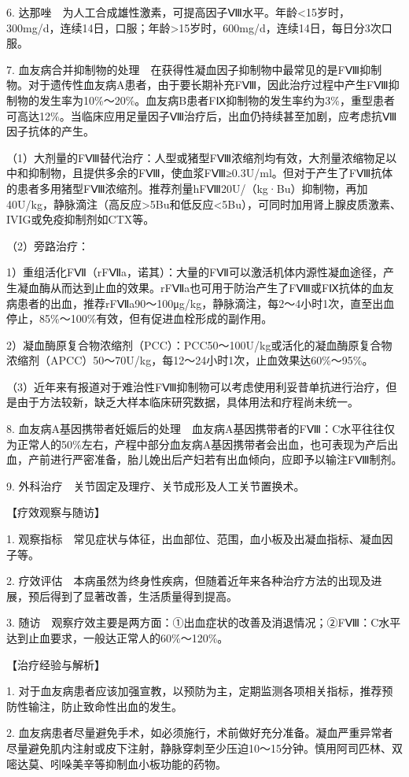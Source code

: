 6.
达那唑　为人工合成雄性激素，可提高因子Ⅷ水平。年龄<15岁时，300mg/d，连续14日，口服；年龄\textgreater{}15岁时，600mg/d，连续14日，每日分3次口服。

7.
血友病合并抑制物的处理　在获得性凝血因子抑制物中最常见的是FⅧ抑制物。对于遗传性血友病A患者，由于要长期补充FⅧ，因此治疗过程中产生FⅧ抑制物的发生率为10\%～20\%。血友病B患者FⅨ抑制物的发生率约为3\%，重型患者可高达12\%。当临床应用足量因子Ⅷ治疗后，出血仍持续甚至加剧，应考虑抗Ⅷ因子抗体的产生。

（1）大剂量的FⅧ替代治疗：人型或猪型FⅧ浓缩剂均有效，大剂量浓缩物足以中和抑制物，且提供多余的FⅧ，使血浆FⅧ≥0.3U/ml。但对于产生了FⅧ抗体的患者多用猪型FⅧ浓缩剂。推荐剂量hFⅧ20U/（kg·Bu）抑制物，再加40U/kg，静脉滴注（高反应\textgreater{}5Bu和低反应<5Bu），可同时加用肾上腺皮质激素、IVIG或免疫抑制剂如CTX等。

（2）旁路治疗：

1）重组活化FⅦ（rFⅦa，诺其）：大量的FⅦ可以激活机体内源性凝血途径，产生凝血酶从而达到止血的效果。rFⅦa也可用于防治产生了FⅧ或FⅨ抗体的血友病患者的出血，推荐rFⅦa90～100μg/kg，静脉滴注，每2～4小时1次，直至出血停止，85\%～100\%有效，但有促进血栓形成的副作用。

2）凝血酶原复合物浓缩剂（PCC）：PCC50～100U/kg或活化的凝血酶原复合物浓缩剂（APCC）50～70U/kg，每12～24小时1次，止血效果达60\%～95\%。

（3）近年来有报道对于难治性FⅧ抑制物可以考虑使用利妥昔单抗进行治疗，但是由于方法较新，缺乏大样本临床研究数据，具体用法和疗程尚未统一。

8.
血友病A基因携带者妊娠后的处理　血友病A基因携带者的FⅧ：C水平往往仅为正常人的50\%左右，产程中部分血友病A基因携带者会出血，也可表现为产后出血，产前进行严密准备，胎儿娩出后产妇若有出血倾向，应即予以输注FⅧ制剂。

9. 外科治疗　关节固定及理疗、关节成形及人工关节置换术。

【疗效观察与随访】

1.
观察指标　常见症状与体征，出血部位、范围，血小板及出凝血指标、凝血因子等。

2.
疗效评估　本病虽然为终身性疾病，但随着近年来各种治疗方法的出现及进展，预后得到了显著改善，生活质量得到提高。

3.
随访　观察疗效主要是两方面：①出血症状的改善及消退情况；②FⅧ：C水平达到止血要求，一般达正常人的60\%～120\%。

【治疗经验与解析】

1.
对于血友病患者应该加强宣教，以预防为主，定期监测各项相关指标，推荐预防性输注，防止致命性出血的发生。

2.
血友病患者尽量避免手术，如必须施行，术前做好充分准备。凝血严重异常者尽量避免肌内注射或皮下注射，静脉穿刺至少压迫10～15分钟。慎用阿司匹林、双嘧达莫、吲哚美辛等抑制血小板功能的药物。


